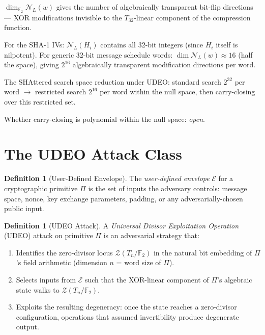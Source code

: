 \documentclass[runningheads]{llncs}
\theoremstyle{plain}
\theoremstyle{definition}
\newtheorem{definition}[theorem]{Definition}
\newcommand{\GFtwo}{\mathbb{F}_2}
\newcommand{\ZDlocus}{\mathcal{Z}}
\begin{document}
$\dim_{\GFtwo} \mathcal{N}_L(w)$ gives the number of algebraically transparent
bit-flip directions — XOR modifications invisible to the $T_{32}$-linear
component of the compression function.

For the SHA-1 IVs: $\mathcal{N}_L(H_i)$ contains all 32-bit integers
(since $H_i$ itself is nilpotent). For generic 32-bit message schedule words:
$\dim \mathcal{N}_L(w) \approx 16$ (half the space), giving $2^{16}$
algebraically transparent modification directions per word.

The SHAttered search space reduction under UDEO:
standard search $2^{32}$ per word $\to$ restricted search $2^{16}$ per word
within the null space, then carry-closing over this restricted set.

Whether carry-closing is polynomial within the null space: \emph{open}.


\section{The UDEO Attack Class}
\label{sec:udeo}

\begin{definition}[User-Defined Envelope]
The \emph{user-defined envelope} $\mathcal{E}$ for a cryptographic primitive $\Pi$
is the set of inputs the adversary controls: message space, nonce, key exchange
parameters, padding, or any adversarially-chosen public input.
\end{definition}

\begin{definition}[UDEO Attack]
\label{def:udeo}
A \emph{Universal Divisor Exploitation Operation} (UDEO) attack on primitive $\Pi$
is an adversarial strategy that:
\begin{enumerate}
\item Identifies the zero-divisor locus $\ZDlocus(T_n/\GFtwo)$ in the natural
      bit embedding of $\Pi$'s field arithmetic (dimension $n$ = word size of $\Pi$).
\item Selects inputs from $\mathcal{E}$ such that the XOR-linear component of
      $\Pi$'s algebraic state walks to $\ZDlocus(T_n/\GFtwo)$.
\item Exploits the resulting degeneracy: once the state reaches a zero-divisor
      configuration, operations that assumed invertibility produce degenerate output.
\end{enumerate}
\end{definition}
\end{document}
